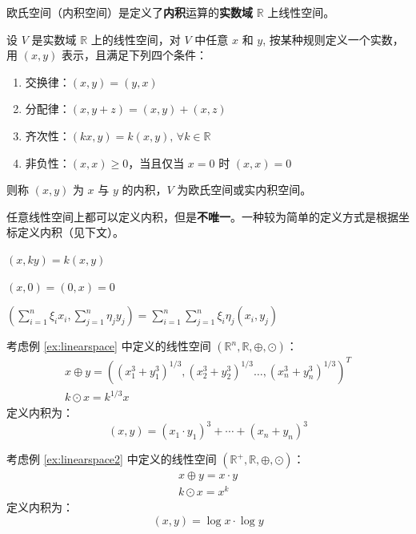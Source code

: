 \noindent 欧氏空间（内积空间）是定义了\textbf{内积}运算的\textbf{实数域} $\mathbb R$ 上线性空间。

\begin{definition}[内积，欧式空间]
设 $V$ 是实数域 $\mathbb R$ 上的线性空间，对 $V$ 中任意 $x$ 和 $y$, 按某种规则定义一个实数，用 $(x,y)$ 表示，且满足下列四个条件：
\begin{enumerate}
    \item 交换律：$(x,y)=(y,x)$
    \item 分配律：$(x,y+z)=(x,y)+(x,z)$
    \item 齐次性：$(kx,y)=k(x,y),\,\forall k\in \mathbb R$
    \item 非负性：$(x,x)\geq 0$，当且仅当 $x=0$ 时 $(x,x)=0$
\end{enumerate}
则称 $(x,y)$ 为 $x$ 与 $y$ 的内积，$V$ 为欧氏空间或实内积空间。
\end{definition}

\begin{remark}
任意线性空间上都可以定义内积，但是\textbf{不唯一}。一种较为简单的定义方式是根据坐标定义内积（见下文）。
\end{remark}

\begin{property}
$(x,ky)=k(x,y)$
\end{property}
\begin{property}
$(x,0)=(0,x)=0$
\end{property}
\begin{property}[线性性]
$\left(\sum_{i=1}^n\xi_ix_i,\sum_{j=1}^n\eta_jy_j\right)=\sum_{i=1}^n\sum_{j=1}^n\xi_i\eta_j(x_i,y_j)$
\end{property}

\begin{example}
考虑例 \ref{ex:linearspace} 中定义的线性空间 $(\mathbb R^n,\mathbb R,\oplus,\odot)$：
\begin{gather*}
    x\oplus y=((x_1^3+y_1^3)^{1/3},(x_2^3+y_2^3)^{1/3}\ldots,(x_n^3+y_n^3)^{1/3})^T\\
    k\odot x=k^{1/3}x
\end{gather*}
定义内积为：
\[
    (x,y)=(x_1\cdot y_1)^3+\cdots+(x_n+y_n)^3
\]
\end{example}

\begin{example}
\label{ex:innerproduct}
考虑例 \ref{ex:linearspace2} 中定义的线性空间 $(\mathbb R^+,\mathbb R,\oplus,\odot)$：
\begin{gather*}
    x\oplus y=x\cdot y\\
    k\odot x=x^k
\end{gather*}
定义内积为：
\[
    (x,y)=\log x\cdot \log y
\]
\end{example}

